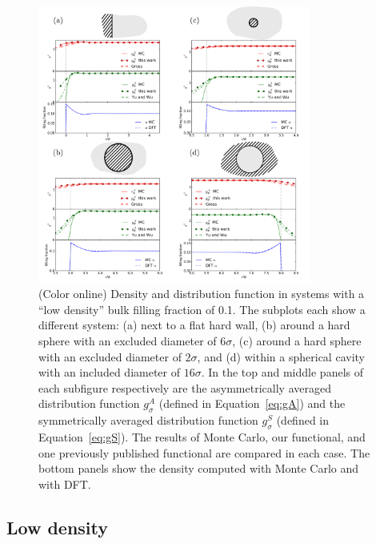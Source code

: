 \begin{figure}
  \noindent\includegraphics[width=0.8\textwidth]{figs/low-density}
  \caption{ (Color online) Density and distribution function in systems
    with a ``low density'' bulk filling fraction of 0.1.  The
    subplots each show a different system: (a) next to a flat hard wall, (b)
    around a hard sphere with an excluded diameter of $6\sigma$, (c)
    around a hard sphere with an excluded diameter of $2\sigma$, and
    (d) within a spherical cavity with an included diameter of $16\sigma$.
    In the top and middle panels of each subfigure respectively are the
    asymmetrically averaged distribution function $g_\sigma^A$ (defined
    in Equation~\ref{eq:gA}) and the symmetrically averaged
    distribution function $g_\sigma^S$ (defined in
    Equation~\ref{eq:gS}).  The results of Monte Carlo, our
    functional, and one previously published
    functional\cite{gross2009density,
      yu2002fmt-dft-inhomogeneous-associating} are compared in each
    case.  The bottom panels show the density computed with
    Monte Carlo and with DFT.}
  \label{fig:low-density}
\end{figure}

\subsection{Low density}


